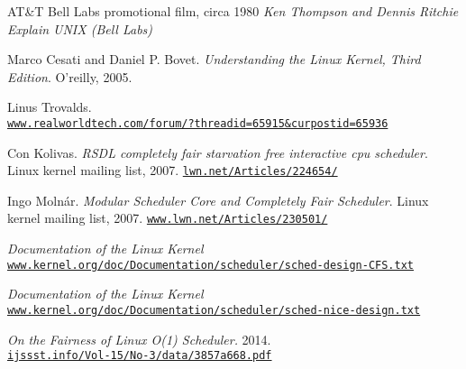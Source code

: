 \documentclass[10pt, oneside]{book}
\begin{document}
\frontmatter
\begin{titlepage}

\end{titlepage}

\tableofcontents
\listoffigures



\mainmatter







\begin{thebibliography}{}
AT\&T Bell Labs promotional film, circa 1980
\textit{Ken Thompson and Dennis Ritchie Explain UNIX (Bell Labs)} %

Marco Cesati and Daniel P. Bovet.
\textit{Understanding the Linux Kernel, Third Edition}.
O'reilly, 2005.

Linus Trovalds.\\
\href{https://www.realworldtech.com/forum/?threadid=65915\&curpostid=65936}{\texttt{www.realworldtech.com/forum/?threadid=65915\&curpostid=65936}}

Con Kolivas.
\textit{RSDL completely fair starvation free interactive cpu scheduler}.
Linux kernel mailing list, 2007.
\href{https://lwn.net/Articles/224654/}{\texttt{lwn.net/Articles/224654/}}

Ingo Moln\'ar.
\textit{Modular Scheduler Core and Completely Fair Scheduler}.
Linux kernel mailing list, 2007. 
\href{https://www.lwn.net/Articles/230501/}{\texttt{www.lwn.net/Articles/230501/}}

\textit{Documentation of the Linux Kernel}\\
\href{https://www.kernel.org/doc/Documentation/scheduler/sched-design-CFS.txt}{\texttt{www.kernel.org/doc/Documentation/scheduler/sched-design-CFS.txt}}

\textit{Documentation of the Linux Kernel}\\
\href{https://www.kernel.org/doc/Documentation/scheduler/sched-nice-design.txt}{\texttt{www.kernel.org/doc/Documentation/scheduler/sched-nice-design.txt}}

\textit{On the Fairness of Linux O(1) Scheduler.} 2014.\\
\href{http://ijssst.info/Vol-15/No-3/data/3857a668.pdf}{\texttt{ijssst.info/Vol-15/No-3/data/3857a668.pdf}}


\end{thebibliography}
\end{document}
